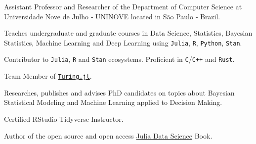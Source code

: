 \vspace{0.25cm}

\begin{cvitems}

	\item Assistant Professor and Researcher of the Department of Computer Science at Universidade Nove de Julho ‑
	UNINOVE located in São Paulo ‑ Brazil.
	\item Teaches undergraduate and graduate courses in Data Science, Statistics, Bayesian Statistics,
	Machine Learning and Deep Learning using \texttt{Julia}, \texttt{R}, \texttt{Python}, \texttt{Stan}.
	\item Contributor to \texttt{Julia}, \texttt{R} and \texttt{Stan} ecosystems. Proficient in \texttt{C}/\texttt{C++} and \texttt{Rust}.
	\item Team Member of \href{https://turing.ml/dev/team/}{\texttt{Turing.jl}}.
	\item Researches, publishes and advises PhD candidates on topics about Bayesian Statistical Modeling and Machine
	Learning applied to Decision Making.
	\item Certified RStudio Tidyverse Instructor.
	\item Author of the open source and open access \href{https://juliadatascience.io}{Julia Data Science} Book.

\end{cvitems}
